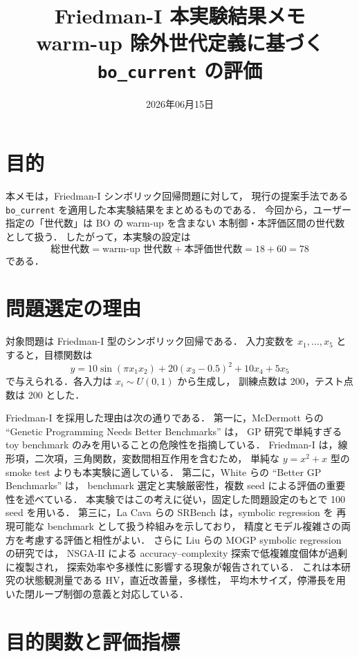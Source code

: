 \documentclass[a4paper,11pt]{ltjsarticle}
\title{Friedman-I 本実験結果メモ\\
\large warm-up 除外世代定義に基づく \texttt{bo\_current} の評価}
\author{}
\date{2026年06月15日}
\newcommand{\HV}{\mathrm{HV}}
\begin{document}
\maketitle

\section{目的}

本メモは，Friedman-I シンボリック回帰問題に対して，
現行の提案手法である \texttt{bo\_current} を適用した本実験結果をまとめるものである．
今回から，ユーザー指定の「世代数」は BO の warm-up を含まない
本制御・本評価区間の世代数として扱う．
したがって，本実験の設定は
\[
  \text{総世代数}
  =
  \text{warm-up 世代数}
  +
  \text{本評価世代数}
  =
  18 + 60
  =
  78
\]
である．

\section{問題選定の理由}

対象問題は Friedman-I 型のシンボリック回帰である．
入力変数を \(x_1,\ldots,x_5\) とすると，目標関数は
\[
  y =
  10\sin(\pi x_1 x_2)
  +20(x_3-0.5)^2
  +10x_4
  +5x_5
\]
で与えられる．各入力は \(x_i\sim U(0,1)\) から生成し，
訓練点数は 200，テスト点数は 200 とした．

Friedman-I を採用した理由は次の通りである．
第一に，McDermott らの ``Genetic Programming Needs Better Benchmarks'' は，
GP 研究で単純すぎる toy benchmark のみを用いることの危険性を指摘している．
Friedman-I は，線形項，二次項，三角関数，変数間相互作用を含むため，
単純な \(y=x^2+x\) 型の smoke test よりも本実験に適している．
第二に，White らの ``Better GP Benchmarks'' は，
benchmark 選定と実験厳密性，複数 seed による評価の重要性を述べている．
本実験ではこの考えに従い，固定した問題設定のもとで 100 seed を用いる．
第三に，La Cava らの SRBench は，symbolic regression を
再現可能な benchmark として扱う枠組みを示しており，
精度とモデル複雑さの両方を考慮する評価と相性がよい．
さらに Liu らの MOGP symbolic regression の研究では，
NSGA-II による accuracy--complexity 探索で低複雑度個体が過剰に複製され，
探索効率や多様性に影響する現象が報告されている．
これは本研究の状態観測量である \(\HV\)，直近改善量，多様性，
平均木サイズ，停滞長を用いた閉ループ制御の意義と対応している．

\section{目的関数と評価指標}
\end{document}
